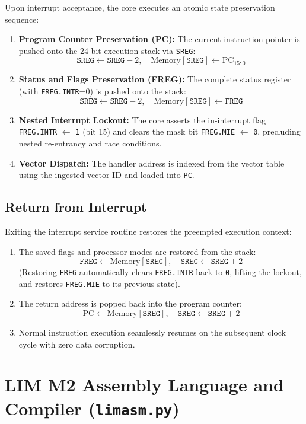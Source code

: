 \documentclass[11pt,a4paper]{article}
\newcommand{\reg}[1]{\texttt{#1}}
\begin{document}
Upon interrupt acceptance, the core executes an atomic state preservation sequence:
\begin{enumerate}
  \item \textbf{Program Counter Preservation (PC):} The current instruction pointer is pushed onto the 24-bit execution stack via \reg{SREG}:
  $$\reg{SREG} \leftarrow \reg{SREG} - 2, \quad \text{Memory}[\reg{SREG}] \leftarrow \text{PC}_{15:0}$$
  \item \textbf{Status and Flags Preservation (FREG):} The complete status register (with \reg{FREG.INTR}=0) is pushed onto the stack:
  $$\reg{SREG} \leftarrow \reg{SREG} - 2, \quad \text{Memory}[\reg{SREG}] \leftarrow \reg{FREG}$$
  \item \textbf{Nested Interrupt Lockout:} The core asserts the in-interrupt flag \reg{FREG.INTR} $\leftarrow$ \texttt{1} (bit 15) and clears the mask bit \reg{FREG.MIE} $\leftarrow$ \texttt{0}, precluding nested re-entrancy and race conditions.
  \item \textbf{Vector Dispatch:} The handler address is indexed from the vector table using the ingested vector ID and loaded into \texttt{PC}.
\end{enumerate}

\subsection{Return from Interrupt}
Exiting the interrupt service routine restores the preempted execution context:
\begin{enumerate}
  \item The saved flags and processor modes are restored from the stack:
  $$\reg{FREG} \leftarrow \text{Memory}[\reg{SREG}], \quad \reg{SREG} \leftarrow \reg{SREG} + 2$$
  (Restoring \reg{FREG} automatically clears \reg{FREG.INTR} back to \texttt{0}, lifting the lockout, and restores \reg{FREG.MIE} to its previous state).
  \item The return address is popped back into the program counter:
  $$\text{PC} \leftarrow \text{Memory}[\reg{SREG}], \quad \reg{SREG} \leftarrow \reg{SREG} + 2$$
  \item Normal instruction execution seamlessly resumes on the subsequent clock cycle with zero data corruption.
\end{enumerate}

\clearpage
\section{LIM M2 Assembly Language and Compiler (\texttt{limasm.py})}
\end{document}
